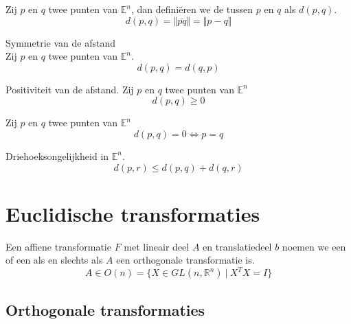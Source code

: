 \documentclass[main.tex]{subfiles}
\begin{document}

\begin{de}
  Zij $p$ en $q$ twee punten van $\mathbb{E}^{n}$, dan defini\"eren we de  tussen $p$ en $q$ als $d(p,q)$.
  \[ d(p,q) = \Vert \overline{pq} \Vert = \Vert p-q \Vert \]
\end{de}

\begin{ei}
  \label{ei:symmetrie-afstand}
  Symmetrie van de afstand\\
  Zij $p$ en $q$ twee punten van $\mathbb{E}^{n}$.
  \[ d(p,q) = d(q,p) \]
\end{ei}

\begin{ei}
  \label{ei:afstand-positief}
  Positiviteit van de afstand.
  Zij $p$ en $q$ twee punten van $\mathbb{E}^{n}$
  \[ d(p,q) \ge 0 \]
\end{ei}

\begin{ei}
  \label{ei:afstand-nul-gelijk}
  Zij $p$ en $q$ twee punten van $\mathbb{E}^{n}$
  \[ d(p,q) = 0 \Leftrightarrow p = q \]
\end{ei}

\begin{ei}
  \label{ei:driehoeksongelijkheid-in-En}
  Driehoeksongelijkheid in $\mathbb{E}^{n}$.
  \[ d(p,r) \le d(p,q) + d(q,r) \]
\end{ei}

\section{Euclidische transformaties}
\label{sec:eucl-transf}

\begin{de}
  \label{de:euclidische-transformatie}
  Een affiene transformatie $F$ met lineair deel $A$ en translatiedeel $b$ noemen we een  of een  als en slechts als $A$ een orthogonale transformatie is.
  \[ A \in O(n) = \{ X \in GL(n,\mathbb{R}^{n}) \ |\ X^{T}X = I \} \]
\end{de}

\subsection{Orthogonale transformaties}
\label{sec:orth-transf}
\end{document}
